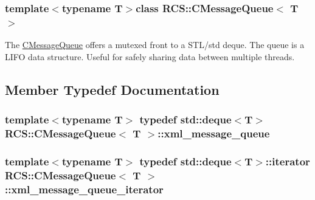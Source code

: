 \subsubsection*{template$<$typename T$>$class R\-C\-S\-::\-C\-Message\-Queue$<$ T $>$}

The \hyperlink{classRCS_1_1CMessageQueue}{C\-Message\-Queue} offers a mutexed front to a S\-T\-L/std deque. The queue is a L\-I\-F\-O data structure. Useful for safely sharing data between multiple threads. 

\subsection{Member Typedef Documentation}
\hypertarget{classRCS_1_1CMessageQueue_a272ec6240c0ae616f66e71a033326e28}{
\subsubsection[{xml\-\_\-message\-\_\-queue}]{\setlength{\rightskip}{0pt plus 5cm}template$<$typename T$>$ typedef std\-::deque$<$T$>$ {\bf R\-C\-S\-::\-C\-Message\-Queue}$<$ T $>$\-::{\bf xml\-\_\-message\-\_\-queue}}}\label{classRCS_1_1CMessageQueue_a272ec6240c0ae616f66e71a033326e28}
\hypertarget{classRCS_1_1CMessageQueue_aa229add119e43aa53229252b6dffb691}{
\subsubsection[{xml\-\_\-message\-\_\-queue\-\_\-iterator}]{\setlength{\rightskip}{0pt plus 5cm}template$<$typename T$>$ typedef std\-::deque$<$T$>$\-::iterator {\bf R\-C\-S\-::\-C\-Message\-Queue}$<$ T $>$\-::{\bf xml\-\_\-message\-\_\-queue\-\_\-iterator}}}\label{classRCS_1_1CMessageQueue_aa229add119e43aa53229252b6dffb691}


